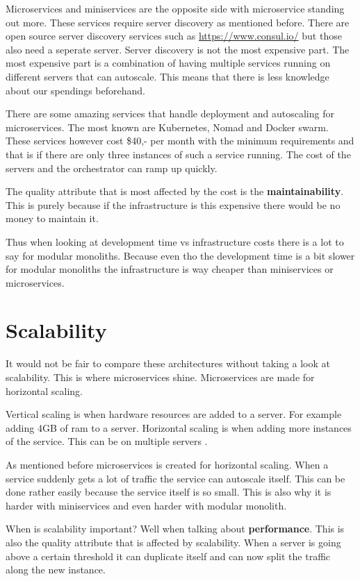 Microservices and miniservices are the opposite side with microservice standing out more. These services require server discovery as mentioned before. There are open source server discovery services such as \href{consul}{https://www.consul.io/} but those also need a seperate server. Server discovery is not the most expensive part. The most expensive part is a combination of having multiple services running on different servers that can autoscale. This means that there is less knowledge about our spendings beforehand.

There are some amazing services that handle deployment and autoscaling for microservices. The most known are Kubernetes, Nomad and Docker swarm. These services however cost \$40,- per month with the minimum requirements and that is if there are only three instances of such a service running. The cost of the servers and the orchestrator can ramp up quickly.

The quality attribute that is most affected by the cost is the \textbf{maintainability}. This is purely because if the infrastructure is this expensive there would be no money to maintain it.

Thus when looking at development time vs infrastructure costs there is a lot to say for modular monoliths. Because even tho the development time is a bit slower for modular monoliths the infrastructure is way cheaper than miniservices or microservices.

\section{Scalability}
\label{sec:Scalability}

It would not be fair to compare these architectures without taking a look at scalability. This is where microservices shine. Microservices are made for horizontal scaling.

Vertical scaling is when hardware resources are added to a server. For example adding 4GB of ram to a server. Horizontal scaling is when adding more instances of the service. This can be on multiple servers \cite{microservicesMultipleServer}.

As mentioned before microservices is created for horizontal scaling. When a service suddenly gets a lot of traffic the service can autoscale itself. This can be done rather easily because the service itself is so small. This is also why it is harder with miniservices and even harder with modular monolith.

When is scalability important? Well when talking about \textbf{performance}. This is also the quality attribute that is affected by scalability. When a server is going above a certain threshold it can duplicate itself and can now split the traffic along the new instance.

